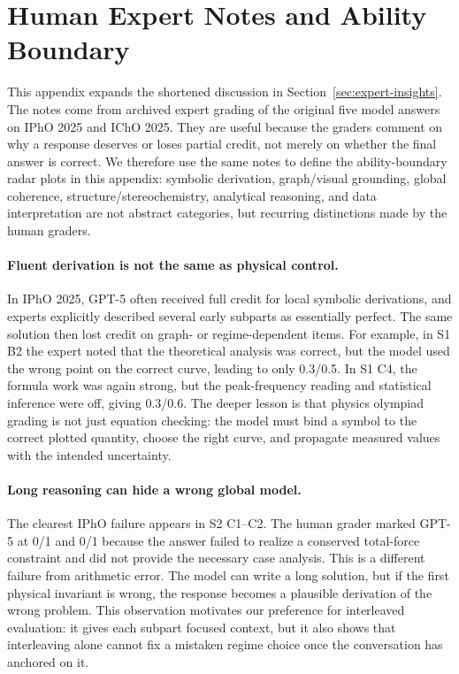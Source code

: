 \documentclass[11pt]{article}
\begin{document}
\section{Human Expert Notes and Ability Boundary}
\label{app:expert_notes}
This appendix expands the shortened discussion in Section~\ref{sec:expert-insights}.
The notes come from archived expert grading of the original five model answers on IPhO 2025 and IChO 2025.
They are useful because the graders comment on why a response deserves or loses partial credit, not merely on whether the final answer is correct.
We therefore use the same notes to define the ability-boundary radar plots in this appendix: symbolic derivation, graph/visual grounding, global coherence, structure/stereochemistry, analytical reasoning, and data interpretation are not abstract categories, but recurring distinctions made by the human graders.

\paragraph{Fluent derivation is not the same as physical control.}
In IPhO 2025, GPT-5 often received full credit for local symbolic derivations, and experts explicitly described several early subparts as essentially perfect.
The same solution then lost credit on graph- or regime-dependent items.
For example, in S1 B2 the expert noted that the theoretical analysis was correct, but the model used the wrong point on the correct curve, leading to only 0.3/0.5.
In S1 C4, the formula work was again strong, but the peak-frequency reading and statistical inference were off, giving 0.3/0.6.
The deeper lesson is that physics olympiad grading is not just equation checking: the model must bind a symbol to the correct plotted quantity, choose the right curve, and propagate measured values with the intended uncertainty.

\paragraph{Long reasoning can hide a wrong global model.}
The clearest IPhO failure appears in S2 C1--C2.
The human grader marked GPT-5 at 0/1 and 0/1 because the answer failed to realize a conserved total-force constraint and did not provide the necessary case analysis.
This is a different failure from arithmetic error.
The model can write a long solution, but if the first physical invariant is wrong, the response becomes a plausible derivation of the wrong problem.
This observation motivates our preference for interleaved evaluation: it gives each subpart focused context, but it also shows that interleaving alone cannot fix a mistaken regime choice once the conversation has anchored on it.
\end{document}
